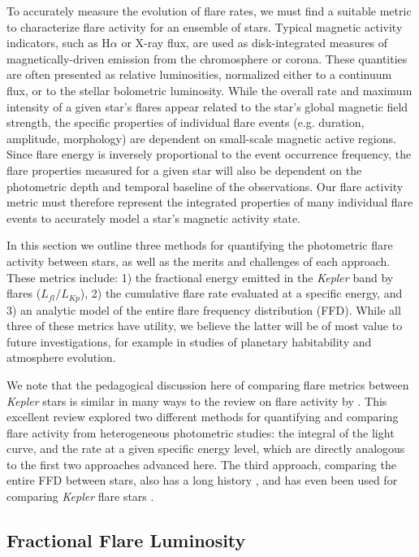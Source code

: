 \documentclass[preprint2]{aastex62}
\newcommand{\Kepler}{\textsl{Kepler}\xspace}
\begin{document}
To accurately measure the evolution of flare rates, we must find a suitable metric to characterize flare activity for an ensemble of stars. Typical magnetic activity indicators, such as H$\alpha$ or X-ray flux, are used as disk-integrated measures of magnetically-driven emission from the chromosphere or corona. These quantities are often presented as relative luminosities, normalized either to a continuum flux, or to the stellar bolometric luminosity.  
While the overall rate and maximum intensity of a given star's flares appear related to the star's global magnetic field strength, the specific properties of individual flare events (e.g. duration, amplitude, morphology) are dependent on small-scale magnetic active regions. Since flare energy is inversely proportional to the event occurrence frequency, the flare properties measured for a given star will also be dependent on the photometric depth and temporal baseline of the observations. Our flare activity metric must therefore represent the integrated properties of many individual flare events to accurately model a star's magnetic activity state.


In this section we outline three methods for quantifying the photometric flare activity between stars, as well as the merits and challenges of each approach. These metrics include: 1) the fractional energy emitted in the \Kepler band by flares ($L_{fl}/L_{Kp}$), 2) the cumulative flare rate evaluated at a specific energy, and 3) an analytic model of the entire flare frequency distribution (FFD). While all three of these metrics have utility, we believe the latter will be of most value to future investigations, for example in studies of planetary habitability and atmosphere evolution. 

We note that the pedagogical discussion here of comparing flare metrics between \Kepler stars is similar in many ways to the review on flare activity by \citet{kunkel1975}. This excellent review explored two different methods for quantifying and comparing flare activity from heterogeneous photometric studies: the integral of the light curve, and the rate at a given specific energy level, which are directly analogous to the first two approaches advanced here. The third approach, comparing the entire FFD between stars, also has a long history \citep[e.g. see Fig. 17 of][]{lme1976}, and has even been used for comparing \Kepler flare stars \citep[e.g.][]{ramsay2013,hawley2014}.




\subsection{Fractional Flare Luminosity}
\label{sec:fracL}
\end{document}
